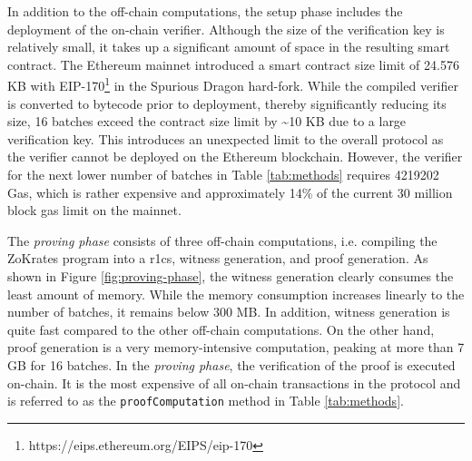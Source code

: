 In addition to the off-chain computations, the setup phase includes the deployment of the on-chain verifier. Although the size of the verification key is relatively small, it takes up a significant amount of space in the resulting smart contract. The Ethereum mainnet introduced a smart contract size limit of 24.576 KB with EIP-170\footnote{https://eips.ethereum.org/EIPS/eip-170} in the Spurious Dragon hard-fork. While the compiled verifier is converted to bytecode prior to deployment, thereby significantly reducing its size, 16 batches exceed the contract size limit by \textasciitilde 10 KB due to a large verification key. This introduces an unexpected limit to the overall protocol as the verifier cannot be deployed on the Ethereum blockchain. However, the verifier for the next lower number of batches in Table \ref{tab:methods} requires 4219202 Gas, which is rather expensive and approximately 14\% of the current 30 million block gas limit on the mainnet.

The \emph{proving phase} consists of three off-chain computations, i.e. compiling the ZoKrates program into a \acrshort{r1cs}, witness generation, and proof generation. As shown in Figure \ref{fig:proving-phase}, the witness generation clearly consumes the least amount of memory. While the memory consumption increases linearly to the number of batches, it remains below 300 MB. In addition, witness generation is quite fast compared to the other off-chain computations. On the other hand, proof generation is a very memory-intensive computation, peaking at more than 7 GB for 16 batches. In the \emph{proving phase}, the verification of the proof is executed on-chain. It is the most expensive of all on-chain transactions in the protocol and is referred to as the \texttt{proofComputation} method in Table \ref{tab:methods}.

